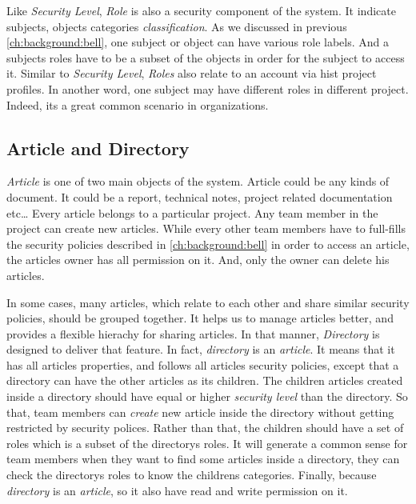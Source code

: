 Like \emph {Security Level}, \emph{Role} is also a security component of the system.
It indicate subjects, objects categories \ie \emph{classification}.
As we discussed in previous \autoref{ch:background:bell}, one subject or object can have various role labels.
And a subjects roles have to be a subset of the objects in order for the subject to access it.
Similar to \emph{Security Level}, \emph{Roles} also relate to an account via hist project profiles. 
In another word, one subject may have different roles in different project.
Indeed, its a great common scenario in organizations.



\subsection{Article and Directory}
\label{ch:hopot_project:article}

\emph{Article} is one of two main objects of the system.
Article could be any kinds of document.
It could be a report, technical notes, project related documentation etc\dots
Every article belongs to a particular project.
Any team member in the project can create new articles.
While every other team members have to full-fills the security policies described in \autoref{ch:background:bell} in order to access an article, the articles owner has all permission on it.
And, only the owner can delete his articles.

In some cases, many articles, which relate to each other and share similar security policies, should be grouped together.
It helps us to manage articles better, and provides a flexible hierachy for sharing articles.
In that manner, \emph{Directory} is designed to deliver that feature.
In fact, \emph{directory} is an \emph{article}.
It means that it has all articles properties, and follows all articles security policies, except that a directory can have the other articles as its children.
The children articles created inside a directory should have equal or higher \emph{security level} than the directory.
So that, team members can \emph{create} new article inside the directory without getting restricted by security polices.
Rather than that, the children should have a set of roles which is a subset of the directorys roles.
It will generate a common sense for team members when they want to find some articles inside a directory, they can check the directorys roles to know the childrens categories.
Finally, because \emph{directory} is an \emph{article}, so it also have read and write permission on it.

